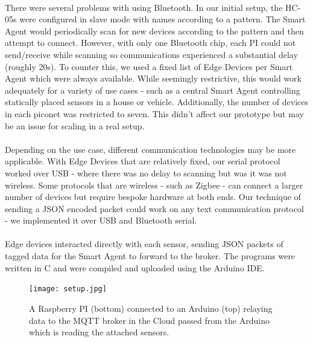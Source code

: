 \paragraph{}
There were several problems with using Bluetooth. In our initial setup, the HC-05s were configured in slave mode with names according to a pattern. The Smart Agent would periodically scan for new devices according to the pattern and then attempt to connect. However, with only one Bluetooth chip, each PI could not send/receive while scanning so communications experienced a substantial delay (roughly 20s). To counter this, we used a fixed list of Edge Devices per Smart Agent which were always available. While seemingly restrictive, this would work adequately for a variety of use cases - such as a central Smart Agent controlling statically placed sensors in a house or vehicle. Additionally, the number of devices in each piconet was restricted to seven. This didn't affect our prototype but may be an issue for scaling in a real setup.

\paragraph{}
Depending on the use case, different communication technologies may be more applicable. With Edge Devices that are relatively fixed, our serial protocol worked over USB - where there was no delay to scanning but was it was not wireless. Some protocols that are wireless - such as Zigbee - can connect a larger number of devices but require bespoke hardware at both ends. Our technique of sending a JSON encoded packet could work on any text communication protocol - we implemented it over USB and Bluetooth serial.

\paragraph{}
Edge devices interacted directly with each sensor, sending JSON packets of tagged data for the Smart Agent to forward to the broker. The programs were written in C and were compiled and uploaded using the Arduino IDE.


\begin{figure}
    \centering
    \texttt{[image: setup.jpg]}
    \caption{A Raspberry PI (bottom) connected to an Arduino (top) relaying data to the MQTT broker in the Cloud passed from the Arduino which is reading the attached sensors.}
    \label{fig:setup}
\end{figure}

